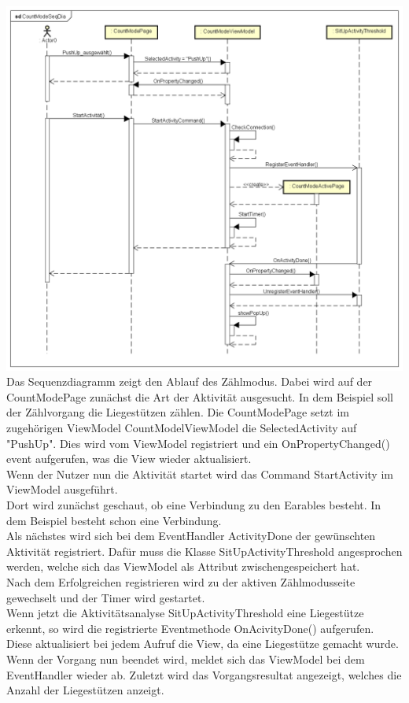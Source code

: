 \documentclass[a4paper,12pt]{article}
\begin{document}
\includegraphics[width=1.1\textwidth]{./Diagramme/CountModeSeqDia.png}\\
Das Sequenzdiagramm zeigt den Ablauf des Zählmodus. Dabei wird auf der CountModePage zunächst die Art der Aktivität ausgesucht. In dem Beispiel soll der Zählvorgang die Liegestützen zählen.
Die CountModePage setzt im zugehörigen ViewModel CountModelViewModel die SelectedActivity auf "PushUp". Dies wird vom ViewModel registriert und ein OnPropertyChanged() event aufgerufen, was die View wieder aktualisiert.\\
Wenn der Nutzer nun die Aktivität startet wird das Command StartActivity im ViewModel ausgeführt.\\Dort wird zunächst geschaut, ob eine Verbindung zu den \gls{Earables} besteht. In dem Beispiel besteht schon eine Verbindung.\\
Als nächstes wird sich bei dem EventHandler ActivityDone der gewünschten Aktivität registriert. Dafür muss die Klasse SitUpActivityThreshold angesprochen werden, welche sich das ViewModel als Attribut zwischengespeichert hat.\\
Nach dem Erfolgreichen registrieren wird zu der aktiven Zählmodusseite gewechselt und der Timer wird gestartet.\\
Wenn jetzt die Aktivitätsanalyse SitUpActivityThreshold eine Liegestütze erkennt, so wird die registrierte Eventmethode OnAcivityDone() aufgerufen. 
Diese aktualisiert bei jedem Aufruf die View, da eine Liegestütze gemacht wurde.\\
Wenn der Vorgang nun beendet wird, meldet sich das ViewModel bei dem EventHandler wieder ab. Zuletzt wird das Vorgangsresultat angezeigt, welches die Anzahl der Liegestützen anzeigt.\\ 
\end{document}
